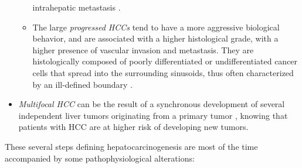 \documentclass[]{article}
\begin{document}
\begin{itemize}
\begin{itemize}
    intrahepatic metastasis \cite{Park2011}.
  \item The large \emph{progressed HCCs} tend to have a more aggressive
    biological behavior, and are associated with a higher histological
    grade, with a higher presence of vascular invasion and metastasis. They are histologically composed of poorly differentiated or
    undifferentiated cancer cells that spread into the surrounding
    sinusoids, thus often characterized by an ill-defined boundary \cite{Kudo2010,Beasley1981,ElSerag2011,Baffy2012,McGlynn2011,Tyson2011, Theise2006, Trevisani2008a}.
  \end{itemize}
\item \emph{Multifocal HCC} can be the result of a synchronous development
  of several independent liver tumors originating from a primary tumor \cite{Trevisani2008a}, knowing that patients with
  HCC are at higher risk of developing new tumors.
\end{itemize}

These several steps defining hepatocarcinogenesis are most of the time
accompanied by some pathophysiological alterations:
\end{document}
